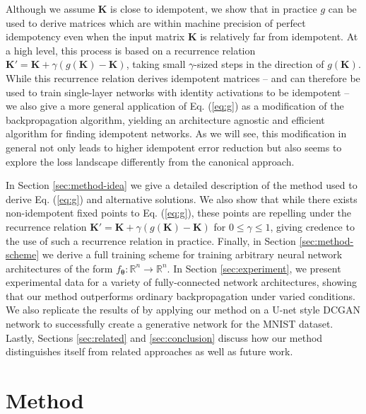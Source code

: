 \documentclass{article}
\theoremstyle{plain}
\theoremstyle{definition}
\theoremstyle{remark}
\newcommand{\vK}{\mathbf{K}}
\newcommand{\vtheta}{\bm{\theta}}
\begin{document}
Although we assume $\vK$ is close to idempotent, we show that in practice $g$ can be used to derive matrices which are within machine precision of perfect idempotency even when the input matrix $\vK$ is relatively far from idempotent. At a high level, this process is based on a recurrence relation ${\vK' = \vK + \gamma(g(\vK) - \vK)}$, taking small $\gamma$-sized steps in the direction of $g(\vK)$. While this recurrence relation derives idempotent matrices -- and can therefore be used to train single-layer networks with identity activations to be idempotent -- we also give a more general application of Eq. (\ref{eq:g}) as a modification of the backpropagation algorithm, yielding an architecture agnostic and efficient algorithm for finding idempotent networks. As we will see, this modification in general not only leads to higher idempotent error reduction but also seems to explore the loss landscape differently from the canonical approach.

In Section \ref{sec:method-idea} we give a detailed description of the method used to derive Eq. (\ref{eq:g}) and alternative solutions. We also show that while there exists non-idempotent fixed points to Eq. (\ref{eq:g}), these points are repelling under the recurrence relation ${\vK' = \vK + \gamma(g(\vK) - \vK)}$ for $0 \leq \gamma \leq 1$, giving credence to the use of such a recurrence relation in practice. Finally, in Section \ref{sec:method-scheme} we derive a full training scheme for training arbitrary neural network architectures of the form ${f_{\vtheta}: \mathbb{R}^n \to \mathbb{R}^n}$. In Section \ref{sec:experiment}, we present experimental data for a variety of fully-connected network architectures, showing that our method outperforms ordinary backpropagation under varied conditions. We also replicate the results of \citealt{shocher-ign} by applying our method on a U-net style DCGAN network to successfully create a generative network for the MNIST dataset. Lastly, Sections \ref{sec:related} and \ref{sec:conclusion} discuss how our method distinguishes itself from related approaches as well as future work.

\section{Method}
\label{sec:method}
\end{document}
